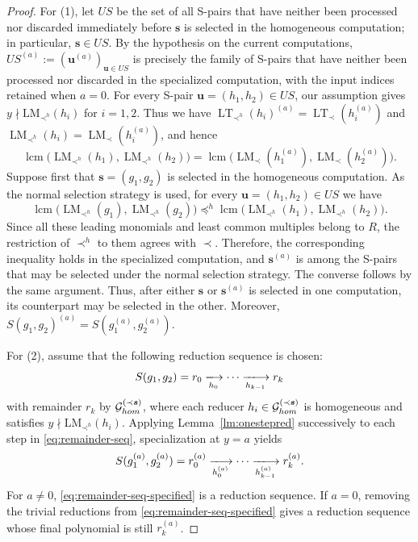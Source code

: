 \documentclass{article}
\theoremstyle{definition}
\theoremstyle{plain}
\theoremstyle{plain}
\theoremstyle{plain}
\theoremstyle{plain}
\numberwithin{equation}{subsection}
\begin{document}
\begin{proof}
For {\rm (1)}, let $US$ be the set of all S-pairs that have neither been processed nor discarded immediately before $\bm{s}$ is selected in the homogeneous computation; in particular, $\bm{s}\in US$.
By the hypothesis on the current computations, $US^{(a)}:=(\bm{u}^{(a)})_{\bm{u}\in US}$ is precisely the family of S-pairs that have neither been processed nor discarded in the specialized computation, with the input indices retained when $a=0$.
For every S-pair $\bm{u}=(h_1,h_2)\in US$, our assumption gives $y\nmid \mathrm{LM}_{\prec^h}(h_i)$ for $i=1,2$.
Thus we have $\operatorname{LT}_{\prec^h}(h_i)^{(a)}=\operatorname{LT}_{\prec}(h_i^{(a)})$ and $\operatorname{LM}_{\prec^h}(h_i)=\operatorname{LM}_{\prec}(h_i^{(a)})$, and hence
\[
\operatorname{lcm} \bigl(\operatorname{LM}_{\prec^h}(h_1),\operatorname{LM}_{\prec^h}(h_2)\bigr) = \operatorname{lcm}\bigl(\operatorname{LM}_{\prec}(h_1^{(a)}), \operatorname{LM}_{\prec}(h_2^{(a)})\bigr).
\]
Suppose first that $\bm{s}=(g_1,g_2)$ is selected in the homogeneous
computation.
As the normal selection strategy is used, for every
$\bm{u}=(h_1,h_2)\in US$ we have
\[
\operatorname{lcm}
\bigl(\operatorname{LM}_{\prec^h}(g_1),
      \operatorname{LM}_{\prec^h}(g_2)\bigr)
\preceq^h
\operatorname{lcm}
\bigl(\operatorname{LM}_{\prec^h}(h_1),
      \operatorname{LM}_{\prec^h}(h_2)\bigr).
\]
Since all these leading monomials and least common multiples belong to
$R$, the restriction of $\prec^h$ to them agrees with $\prec$.
Therefore, the corresponding inequality holds in the specialized
computation, and $\bm{s}^{(a)}$ is among the S-pairs that may be
selected under the normal selection strategy.
The converse follows by the same argument.
Thus, after either $\bm{s}$ or $\bm{s}^{(a)}$ is selected in one
computation, its counterpart may be selected in the other.
Moreover, $S(g_1,g_2)^{(a)}=S(g_1^{(a)},g_2^{(a)})$.

For {\rm (2)}, assume that the following reduction sequence is chosen:
\begin{equation}\label{eq:remainder-seq}
S(g_1,g_2)=r_0 \xlongrightarrow[h_0]{} \cdots \xlongrightarrow[h_{k-1}]{} r_k
\end{equation}
with remainder $r_k$ by $\mathcal{G}^{(\prec \bm{s})}_{\rm hom}$, where each reducer $h_i\in \mathcal{G}^{(\prec \bm{s})}_{\rm hom}$ is homogeneous and satisfies $y\nmid \mathrm{LM}_{\prec^h}(h_i)$.
Applying Lemma~\ref{lm:onestepred} successively to each step in \eqref{eq:remainder-seq}, specialization at $y=a$ yields \begin{equation}\label{eq:remainder-seq-specified}
S(g_1^{(a)},g_2^{(a)})=r_0^{(a)} \xlongrightarrow[h_0^{(a)}]{} \cdots \xlongrightarrow[h_{k-1}^{(a)}]{} r_k^{(a)}.
\end{equation}
For $a\neq0$, \eqref{eq:remainder-seq-specified} is a reduction sequence.
If $a=0$, removing the trivial reductions from \eqref{eq:remainder-seq-specified} gives a reduction sequence whose final polynomial is still $r_k^{(a)}$.


\end{proof}
\end{document}

